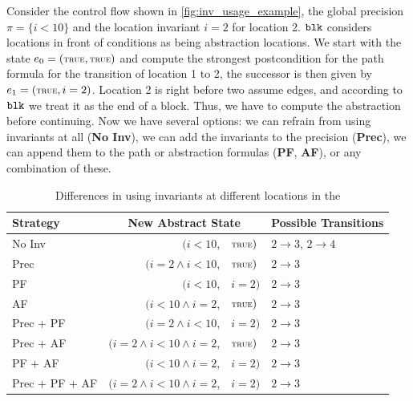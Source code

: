 Consider the control flow shown in \autoref{fig:inv_usage_example}, the global precision $\pi = \{ i < 10 \}$ and the location invariant $i = 2$ for location 2. $\mathtt{blk}{}$ considers locations in front of
conditions as being abstraction locations. We start with the state $e_0 = (\text{\true{}}, \text{\true{}})$ and compute the strongest postcondition for the path formula for the transition of location 1 to 2, the successor 
is then given by $e_1 = (\text{\true{}}, i = 2)$. Location 2 is right before two assume edges, and according to $\mathtt{blk}{}$ we treat it as the end of a block. Thus, we have to compute the abstraction before 
continuing. Now we have several options: we can refrain from using invariants at all (\textbf{No Inv}), we can add the invariants to the precision (\textbf{Prec}), we can append them to the path or 
abstraction formulas (\textbf{PF}, \textbf{AF}), or any combination of these. 

\begin{table}
\centering
 \caption{Differences in using invariants at different locations in the \PredicateCPA{}}
 \label{table:inv_usage_example}
\begin{adjustbox}{max width=\textwidth}
 \begin{tabular}{lrll}
 \toprule
  Strategy & \multicolumn{2}{c}{New Abstract State} & Possible Transitions\\
  \midrule
  No Inv& $(i < 10$,& $\text{\true{}})$ & $2 \rightarrow 3$, $2 \rightarrow 4$\\
  Prec & $(i = 2 \land i < 10$,& $\text{\true{}})$ & $2 \rightarrow 3$\\
  PF & $(i < 10$,& $i = 2)$ & $2 \rightarrow 3$\\
  AF & $(i < 10 \land i = 2$,& $\text{\true{}})$ & $2 \rightarrow 3$\\
  Prec + PF & $(i = 2 \land i < 10$,& $i = 2)$ & $2 \rightarrow 3$\\
  Prec + AF & $(i = 2 \land i < 10 \land i = 2$,& $\text{\true{}})$ & $2 \rightarrow 3$\\
  PF + AF & $(i < 10 \land i = 2$,& $i = 2)$ & $2 \rightarrow 3$\\
  Prec + PF + AF & $(i = 2 \land i < 10 \land i = 2$,& $i = 2)$ & $2 \rightarrow 3$\\
  \bottomrule
 \end{tabular}
 \end{adjustbox}
\end{table}

